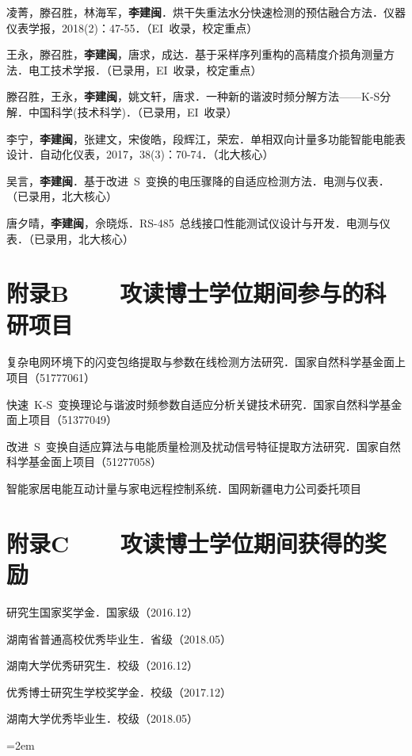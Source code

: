 \begin{publist}
	\item 凌菁，滕召胜，林海军，\textbf{李建闽}．烘干失重法水分快速检测的预估融合方法．仪器仪表学报，2018(2)：47-55．（EI~收录，校定重点）
	\item 王永，滕召胜，\textbf{李建闽}，唐求，成达．基于采样序列重构的高精度介损角测量方法．电工技术学报．（已录用，EI~收录，校定重点）
	\item 滕召胜，王永，\textbf{李建闽}，姚文轩，唐求．一种新的谐波时频分解方法——K-S分解．中国科学(技术科学)．（已录用，EI~收录）
	\item 李宁，\textbf{李建闽}，张建文，宋俊皓，段辉江，荣宏．单相双向计量多功能智能电能表设计．自动化仪表，2017，38(3)：70-74．（北大核心）
	\item 吴言，\textbf{李建闽}．基于改进~S~变换的电压骤降的自适应检测方法．电测与仪表．（已录用，北大核心）
	\item 唐夕晴，\textbf{李建闽}，佘晓烁．RS-485~总线接口性能测试仪设计与开发．电测与仪表．（已录用，北大核心）
\end{publist}
\chapter*{附录B~~~~攻读博士学位期间参与的科研项目}
\setlength{\parindent}{0em}
\begin{publist}
	\item	复杂电网环境下的闪变包络提取与参数在线检测方法研究．国家自然科学基金面上项目（51777061）
	\item	快速~K-S~变换理论与谐波时频参数自适应分析关键技术研究．国家自然科学基金面上项目（51377049）
	\item	改进~S~变换自适应算法与电能质量检测及扰动信号特征提取方法研究．国家自然科学基金面上项目（51277058）
	\item	智能家居电能互动计量与家电远程控制系统．国网新疆电力公司委托项目
\end{publist}
\chapter*{附录C~~~~攻读博士学位期间获得的奖励}
\setlength{\parindent}{0em}
\begin{publist}
	\item	研究生国家奖学金．国家级（2016.12）
	\item	湖南省普通高校优秀毕业生．省级（2018.05）
	\item	湖南大学优秀研究生．校级（2016.12）
	\item	优秀博士研究生学校奖学金．校级（2017.12）
	\item	湖南大学优秀毕业生．校级（2018.05）
\end{publist}
\vfill
{}\hangindent=2em\noindent

\setlength{\parindent}{2em}
